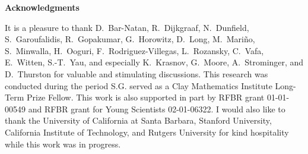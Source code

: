 %
\eqn{}
%


\endexample



\vskip 30pt

\centerline{\bf Acknowledgments}

It is a pleasure to thank D.~Bar-Natan, R.~Dijkgraaf, N.~Dunfield,
S.~Garoufalidis, R.~Gopakumar,
G.~Horowitz, D.~Long, M.~Mari\~no, S.~Minwalla,
H.~Ooguri, F.~Rodriguez-Villegas, L.~Rozansky,
C.~Vafa, E.~Witten, S.-T.~Yau,
and especially
K.~Krasnov, G.~Moore, A.~Strominger, and D.~Thurston
for valuable and stimulating discussions.
This research was conducted during the period S.G.
served as a Clay Mathematics Institute Long-Term Prize Fellow.
This work is also supported in part by RFBR grant 01-01-00549
and RFBR grant for Young Scientists 02-01-06322.
I would also like to thank
the University of California at Santa Barbara,
Stanford University,
California Institute of Technology,
and Rutgers University
for kind hospitality while this work was in progress.

\vskip 30pt




